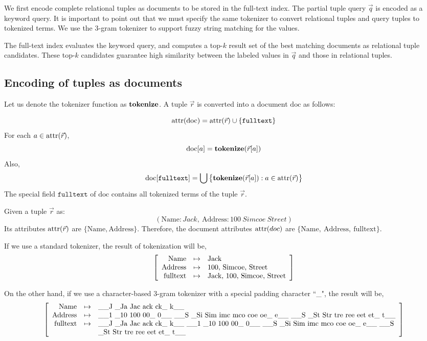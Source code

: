 We first encode complete relational tuples as documents to be stored in the full-text index.
The partial tuple query $\vec q$ is encoded as a keyword query.  It is important to point out that we must specify
the same tokenizer to convert relational tuples and query tuples to tokenized terms.  We use the 3-gram tokenizer to support fuzzy string matching for the values.

The full-text index evaluates the keyword query, and computes a top-$k$ result set of the best matching documents as relational tuple candidates.  These top-$k$ candidates guarantee high similarity between the labeled values in $\vec q$ and those in relational tuples.

\subsection{Encoding of tuples as documents}

Let us denote the tokenizer function as $\mathbf{tokenize}$. A tuple $\vec r$ is converted into a document $\mathrm{doc}$ as follows:

$$
\operatorname{attr}(\mathrm{doc}) = \operatorname{attr}(\vec r) \cup \{\mathtt{fulltext}\}
$$
For each $a\in\operatorname{attr}(\vec r)$,
$$
\mathrm{doc}[a] = \mathbf{tokenize}(\vec r[a])
$$
Also,
$$
\mathrm{doc}[\mathtt{fulltext}] =\bigcup\big\{\mathbf{tokenize}(\vec r[a]): a\in\operatorname{attr}(\vec r)\big\}
$$
The special field $\mathtt{fulltext}$ of $\mathrm{doc}$ contains all tokenized terms of the tuple $\vec r$.

\begin{example}
Given a tuple $\vec r$ as:
$$
(\mathrm{Name}:Jack,\ \mathrm{Address}:100\ Simcoe\ Street)
$$
Its attributes $\operatorname{attr}(\vec r)$ are $\{\mathrm{Name}, \mathrm{Address}\}$. Therefore, the document attributes  $\operatorname{attr}(doc)$ are $\{\mathrm{Name},\ \mathrm{Address},\ \mathrm{fulltext}\}$.

If we use a standard tokenizer, the result of tokenization will be,
$$
\left[\begin{array}{rcl}
\mathrm{Name} & \mapsto & \makebox{Jack} \\
\mathrm{Address} & \mapsto & \makebox{100, Simcoe, Street} \\
\mathrm{fulltext} & \mapsto & \makebox{Jack, 100, Simcoe, Street}
\end{array}\right]
$$

On the other hand, if we use a character-based 3-gram tokenizer with a special padding character ``\_", the result will be,
$$
\left[\begin{array}{rcl}
\mathrm{Name} & \mapsto & \makebox{\_\_J \_Ja Jac ack ck\_ k\_\_} \\
\mathrm{Address} & \mapsto & \makebox{\_\_1 \_10 100 00\_ 0\_\_ \_\_S \_Si Sim imc mco coe oe\_ e\_\_ \_\_S \_St Str tre ree eet et\_ t\_\_} \\
\mathrm{fulltext} & \mapsto & \makebox{\_\_J \_Ja Jac ack ck\_ k\_\_ \_\_1 \_10 100 00\_ 0\_\_ \_\_S \_Si Sim imc mco coe oe\_ e\_\_ \_\_S} \\ 
 & & \makebox{\_St Str tre ree eet et\_ t\_\_}\\
\end{array}\right]
$$

\end{example}

